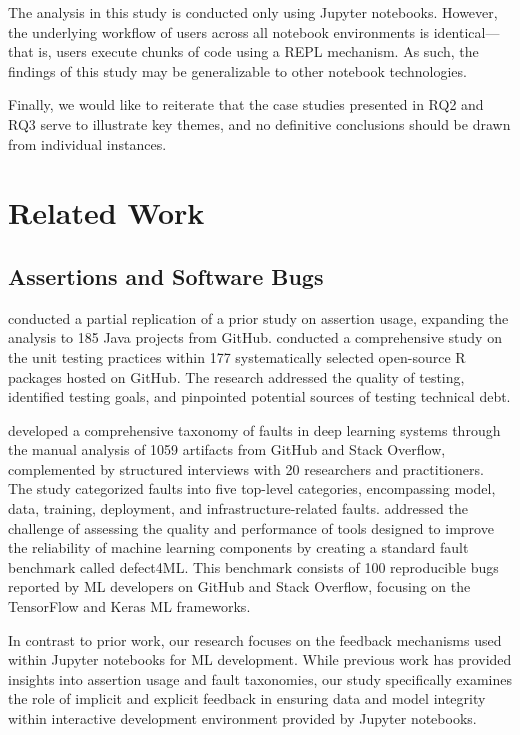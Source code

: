 \documentclass[smallextended]{svjour3}       %
\begin{document}
The analysis in this study is conducted only using Jupyter notebooks. However, the underlying workflow of users across all notebook environments is identical---that is, users execute chunks of code using a REPL mechanism. As such, the findings of this study may be generalizable to other notebook technologies.

Finally, we would like to reiterate that the case studies presented in RQ2 and RQ3 serve to illustrate key themes, and no definitive conclusions should be drawn from individual instances.
\section{Related Work}\label{sec:related}

\subsection{Assertions and Software Bugs}

\citet{kochhar2017revisiting} conducted a partial replication of a prior study on assertion usage, expanding the analysis to 185 Java projects from GitHub. \citet{vidoni2021evaluating} conducted a comprehensive study on the unit testing practices within 177 systematically selected open-source R packages hosted on GitHub. The research addressed the quality of testing, identified testing goals, and pinpointed potential sources of testing technical debt.

\citet{humbatova2020taxonomy} developed a comprehensive taxonomy of faults in deep learning systems through the manual analysis of 1059 artifacts from GitHub and Stack Overflow, complemented by structured interviews with 20 researchers and practitioners. The study categorized faults into five top-level categories, encompassing model, data, training, deployment, and infrastructure-related faults. \citet{morovati2023bugs} addressed the challenge of assessing the quality and performance of tools designed to improve the reliability of machine learning components by creating a standard fault benchmark called defect4ML. This benchmark consists of 100 reproducible bugs reported by ML developers on GitHub and Stack Overflow, focusing on the TensorFlow and Keras ML frameworks.

In contrast to prior work, our research focuses on the feedback mechanisms used within Jupyter notebooks for ML development. While previous work has provided insights into assertion usage and fault taxonomies, our study specifically examines the role of implicit and explicit feedback in ensuring data and model integrity within interactive development environment provided by Jupyter notebooks.
\end{document}
